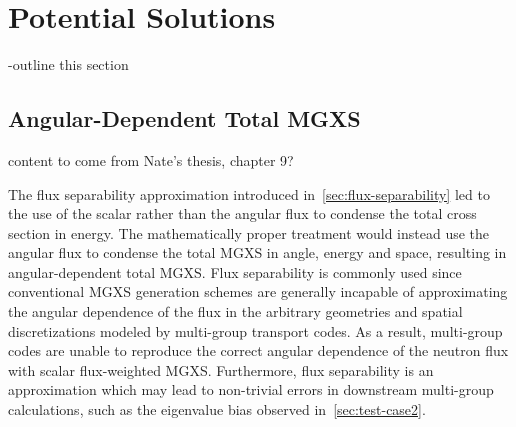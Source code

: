 \section{Potential Solutions}
\label{sec:solutions}

-outline this section


\subsection{Angular-Dependent Total MGXS}
\label{subsec:angle-dep-mgxs}

{\color{red} content to come from Nate's thesis, chapter 9?}

The flux separability approximation introduced in~\autoref{sec:flux-separability} led to the use of the scalar rather than the angular flux to condense the total cross section in energy. The mathematically proper treatment would instead use the angular flux to condense the total MGXS in angle, energy and space, resulting in angular-dependent total MGXS. Flux separability is commonly used since conventional MGXS generation schemes are generally incapable of approximating the angular dependence of the flux in the arbitrary geometries and spatial discretizations modeled by multi-group transport codes. As a result, multi-group codes are unable to reproduce the correct angular dependence of the neutron flux with scalar flux-weighted MGXS. Furthermore, flux separability is an approximation which may lead to non-trivial errors in downstream multi-group calculations, such as the eigenvalue bias observed in~\autoref{sec:test-case2}.

